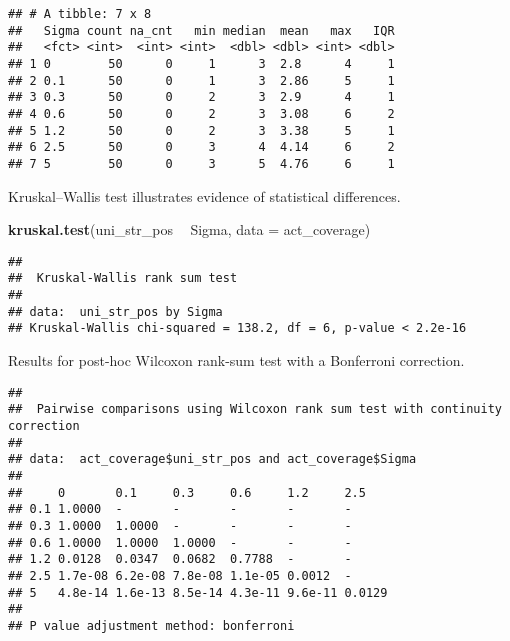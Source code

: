 \documentclass[]{book}
\newenvironment{Shaded}{\begin{snugshade}}{\end{snugshade}}
\newcommand{\DataTypeTok}[1]{\textcolor[rgb]{0.13,0.29,0.53}{#1}}
\newcommand{\KeywordTok}[1]{\textcolor[rgb]{0.13,0.29,0.53}{\textbf{#1}}}
\newcommand{\NormalTok}[1]{#1}
\newcommand{\OperatorTok}[1]{\textcolor[rgb]{0.81,0.36,0.00}{\textbf{#1}}}
\newcommand{\OtherTok}[1]{\textcolor[rgb]{0.56,0.35,0.01}{#1}}
\newcommand{\StringTok}[1]{\textcolor[rgb]{0.31,0.60,0.02}{#1}}
\begin{document}
\begin{verbatim}
## # A tibble: 7 x 8
##   Sigma count na_cnt   min median  mean   max   IQR
##   <fct> <int>  <int> <int>  <dbl> <dbl> <int> <dbl>
## 1 0        50      0     1      3  2.8      4     1
## 2 0.1      50      0     1      3  2.86     5     1
## 3 0.3      50      0     2      3  2.9      4     1
## 4 0.6      50      0     2      3  3.08     6     2
## 5 1.2      50      0     2      3  3.38     5     1
## 6 2.5      50      0     3      4  4.14     6     2
## 7 5        50      0     3      5  4.76     6     1
\end{verbatim}

Kruskal--Wallis test illustrates evidence of statistical differences.

\begin{Shaded}
\begin{Highlighting}[]
\KeywordTok{kruskal.test}\NormalTok{(uni_str_pos }\OperatorTok{~}\StringTok{ }\NormalTok{Sigma, }\DataTypeTok{data =}\NormalTok{ act_coverage)}
\end{Highlighting}
\end{Shaded}

\begin{verbatim}
## 
##  Kruskal-Wallis rank sum test
## 
## data:  uni_str_pos by Sigma
## Kruskal-Wallis chi-squared = 138.2, df = 6, p-value < 2.2e-16
\end{verbatim}

Results for post-hoc Wilcoxon rank-sum test with a Bonferroni correction.

\begin{Shaded}
\end{Shaded}

\begin{verbatim}
## 
##  Pairwise comparisons using Wilcoxon rank sum test with continuity correction 
## 
## data:  act_coverage$uni_str_pos and act_coverage$Sigma 
## 
##     0       0.1     0.3     0.6     1.2     2.5   
## 0.1 1.0000  -       -       -       -       -     
## 0.3 1.0000  1.0000  -       -       -       -     
## 0.6 1.0000  1.0000  1.0000  -       -       -     
## 1.2 0.0128  0.0347  0.0682  0.7788  -       -     
## 2.5 1.7e-08 6.2e-08 7.8e-08 1.1e-05 0.0012  -     
## 5   4.8e-14 1.6e-13 8.5e-14 4.3e-11 9.6e-11 0.0129
## 
## P value adjustment method: bonferroni
\end{verbatim}
\end{document}
